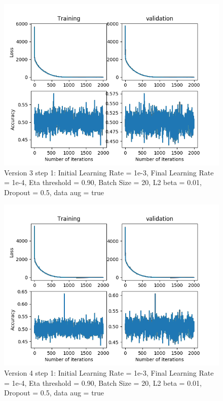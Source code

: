 \documentclass[12pt,reqno]{amsart}
\numberwithin{equation}{section}
\begin{document}
\begin{enumerate}
\begin{figure}[H]
\centering
\includegraphics[scale=0.6]{data_liquid10_version3_step1}
\caption{Version 3 step 1: Initial Learning Rate = 1e-3, Final Learning Rate = 1e-4, Eta threshold = 0.90, Batch Size = 20, L2 beta = 0.01, Dropout = 0.5, data aug = true}
\end{figure}

\begin{figure}[H]
\centering
\includegraphics[scale=0.6]{data_liquid10_version4_step1}
\caption{Version 4 step 1: Initial Learning Rate = 1e-3, Final Learning Rate = 1e-4, Eta threshold = 0.90, Batch Size = 20, L2 beta = 0.01, Dropout = 0.5, data aug = true}
\end{figure}


\end{enumerate}
\end{document}
